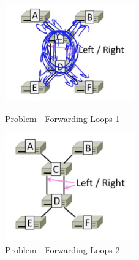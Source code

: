 \documentclass[12pt]{ctexart}   %
\begin{document}
\begin{itemize}
		\begin{figure}
			\begin{minipage}[t]{0.5\linewidth}
				\centering
				\includegraphics[width=2.2in]{images/3-8-2}
				\caption{Problem - Forwarding Loops 1}
				\label{fig:3-8-2}
			\end{minipage}
			\begin{minipage}[t]{0.5\linewidth}
				\centering
				\includegraphics[width=2.2in]{images/3-8-3}
				\caption{Problem - Forwarding Loops 2}
				\label{fig:3-8-3}
			\end{minipage}
		\end{figure}
	\end{itemize}
	
\end{document}

